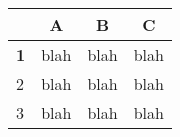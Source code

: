   \begin{tabular}{l*{3}{c}}
    & A & B & C \\
    \hline
    \textbf<2>{1} & blah & blah & blah \\
    2 & blah & blah & blah \\
    3 & blah & blah & blah \\
    \hline
  \end{tabular}
